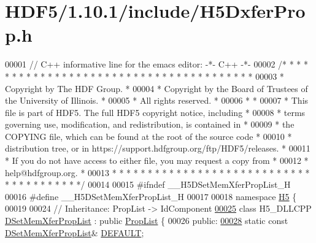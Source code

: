 \hypertarget{_h_d_f5_21_810_81_2include_2_h5_dxfer_prop_8h_source}{}\section{H\+D\+F5/1.10.1/include/\+H5\+Dxfer\+Prop.h}
\label{_h_d_f5_21_810_81_2include_2_h5_dxfer_prop_8h_source}

\begin{DoxyCode}
00001 \textcolor{comment}{// C++ informative line for the emacs editor: -*- C++ -*-}
00002 \textcolor{comment}{/* * * * * * * * * * * * * * * * * * * * * * * * * * * * * * * * * * * * * * *}
00003 \textcolor{comment}{ * Copyright by The HDF Group.                                               *}
00004 \textcolor{comment}{ * Copyright by the Board of Trustees of the University of Illinois.         *}
00005 \textcolor{comment}{ * All rights reserved.                                                      *}
00006 \textcolor{comment}{ *                                                                           *}
00007 \textcolor{comment}{ * This file is part of HDF5.  The full HDF5 copyright notice, including     *}
00008 \textcolor{comment}{ * terms governing use, modification, and redistribution, is contained in    *}
00009 \textcolor{comment}{ * the COPYING file, which can be found at the root of the source code       *}
00010 \textcolor{comment}{ * distribution tree, or in https://support.hdfgroup.org/ftp/HDF5/releases.  *}
00011 \textcolor{comment}{ * If you do not have access to either file, you may request a copy from     *}
00012 \textcolor{comment}{ * help@hdfgroup.org.                                                        *}
00013 \textcolor{comment}{ * * * * * * * * * * * * * * * * * * * * * * * * * * * * * * * * * * * * * * */}
00014 
00015 \textcolor{preprocessor}{#ifndef \_\_H5DSetMemXferPropList\_H}
00016 \textcolor{preprocessor}{#define \_\_H5DSetMemXferPropList\_H}
00017 
00018 \textcolor{keyword}{namespace }\hyperlink{namespace_h5}{H5} \{
00019 
00024 \textcolor{comment}{//  Inheritance: PropList -> IdComponent}
\hyperlink{class_h5_1_1_d_set_mem_xfer_prop_list}{00025} \textcolor{keyword}{class }H5\_DLLCPP \hyperlink{class_h5_1_1_d_set_mem_xfer_prop_list}{DSetMemXferPropList} : \textcolor{keyword}{public} \hyperlink{class_h5_1_1_prop_list}{PropList} \{
00026    \textcolor{keyword}{public}:
\hyperlink{class_h5_1_1_d_set_mem_xfer_prop_list_ae69bf0ec7bccd4bb793ffe1ff770d8c4}{00028}         \textcolor{keyword}{static} \textcolor{keyword}{const} \hyperlink{class_h5_1_1_d_set_mem_xfer_prop_list}{DSetMemXferPropList}& \hyperlink{class_h5_1_1_d_set_mem_xfer_prop_list_ae69bf0ec7bccd4bb793ffe1ff770d8c4}{DEFAULT};

\end{DoxyCode}
